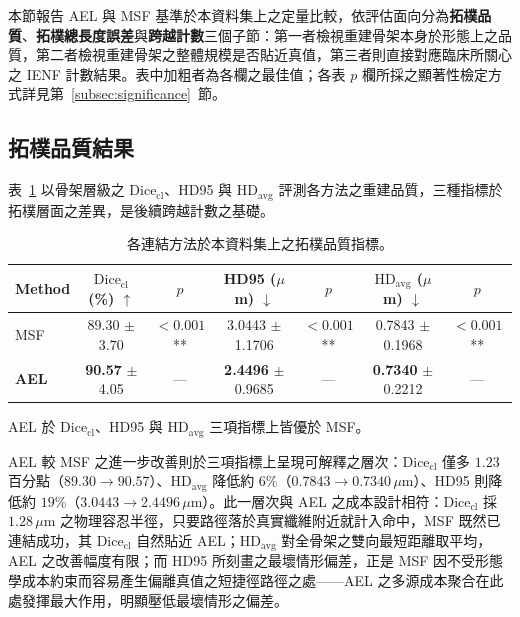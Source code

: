本節報告 AEL 與 MSF 基準於本資料集上之定量比較，依評估面向分為\textbf{拓樸品質}、\textbf{拓樸總長度誤差}與\textbf{跨越計數}三個子節：第一者檢視重建骨架本身於形態上之品質，第二者檢視重建骨架之整體規模是否貼近真值，第三者則直接對應臨床所關心之 IENF 計數結果。表中加粗者為各欄之最佳值；各表 $p$ 欄所採之顯著性檢定方式詳見第~\ref{subsec:significance}~節。


\subsection{拓樸品質結果}
\label{subsec:topo-results}

表~\ref{tab:topology-results} 以骨架層級之 $\text{Dice}_{\text{cl}}$、HD95 與 $\text{HD}_{\text{avg}}$ 評測各方法之重建品質，三種指標於拓樸層面之差異，是後續跨越計數之基礎。

\begin{table}[htbp]
  \centering
  \caption{各連結方法於本資料集上之拓樸品質指標。}
  \label{tab:topology-results}
  \small
  \setlength{\tabcolsep}{3pt}
  \begin{tabular}{lcccccc}
    \toprule
    Method & $\text{Dice}_{\text{cl}}$ (\%) $\uparrow$ & $p$ & HD95 ($\mu$m) $\downarrow$ & $p$ & $\text{HD}_{\text{avg}}$ ($\mu$m) $\downarrow$ & $p$ \\
    \midrule
    MSF       & 89.30 $\pm$ 3.70 & $<\!0.001$** & 3.0443 $\pm$ 1.1706 & $<\!0.001$** & 0.7843 $\pm$ 0.1968 & $<\!0.001$** \\
    \textbf{AEL} & \textbf{90.57} $\pm$ 4.05 & --- & \textbf{2.4496} $\pm$ 0.9685 & --- & \textbf{0.7340} $\pm$ 0.2212 & --- \\
    \bottomrule
  \end{tabular}
\end{table}

AEL 於 $\text{Dice}_{\text{cl}}$、HD95 與 $\text{HD}_{\text{avg}}$ 三項指標上皆優於 MSF。

AEL 較 MSF 之進一步改善則於三項指標上呈現可解釋之層次：$\text{Dice}_{\text{cl}}$ 僅多 $1.23$ 百分點（$89.30 \to 90.57$）、$\text{HD}_{\text{avg}}$ 降低約 $6\%$（$0.7843 \to 0.7340\,\mu\text{m}$）、HD95 則降低約 $19\%$（$3.0443 \to 2.4496\,\mu\text{m}$）。此一層次與 AEL 之成本設計相符：$\text{Dice}_{\text{cl}}$ 採 $1.28\,\mu\text{m}$ 之物理容忍半徑，只要路徑落於真實纖維附近就計入命中，MSF 既然已連結成功，其 $\text{Dice}_{\text{cl}}$ 自然貼近 AEL；$\text{HD}_{\text{avg}}$ 對全骨架之雙向最短距離取平均，AEL 之改善幅度有限；而 HD95 所刻畫之最壞情形偏差，正是 MSF 因不受形態學成本約束而容易產生偏離真值之短捷徑路徑之處——AEL 之多源成本聚合在此處發揮最大作用，明顯壓低最壞情形之偏差。

